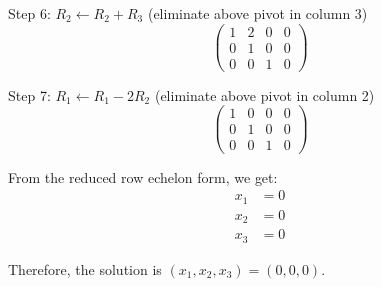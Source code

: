 Step 6: $R_2 \leftarrow R_2 + R_3$ (eliminate above pivot in column 3)
\[
	\left(\begin{array}{ccc|c}
			1 & 2 & 0 & 0 \\
			0 & 1 & 0 & 0 \\
			0 & 0 & 1 & 0
		\end{array}\right)
\]

Step 7: $R_1 \leftarrow R_1 - 2R_2$ (eliminate above pivot in column 2)
\[
	\left(\begin{array}{ccc|c}
			1 & 0 & 0 & 0 \\
			0 & 1 & 0 & 0 \\
			0 & 0 & 1 & 0
		\end{array}\right)
\]

From the reduced row echelon form, we get:
\begin{align*}
	x_1 & = 0 \\
	x_2 & = 0 \\
	x_3 & = 0
\end{align*}

Therefore, the solution is $\boxed{(x_1, x_2, x_3) = (0, 0, 0)}$.
